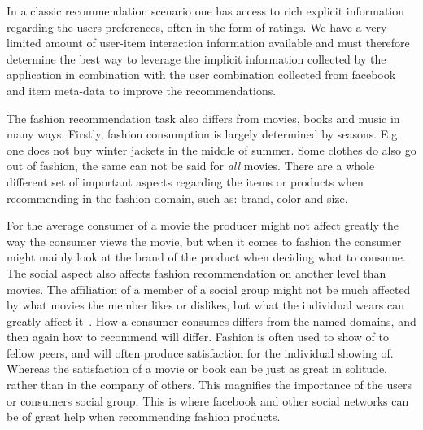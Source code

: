 In a classic recommendation scenario one has access to rich explicit information regarding the users preferences, often in the form of ratings. We have a very limited amount of user-item interaction information available and must therefore determine the best way to leverage the implicit information collected by the application in combination with the user combination collected from facebook and item meta-data to improve the recommendations.

The fashion recommendation task also differs from movies, books and music in many ways.
Firstly, fashion consumption is largely determined by seasons.
E.g. one does not buy winter jackets in the middle of summer.
Some clothes do also go out of fashion, the same can not be said for \emph{all} movies.
There are a whole different set of important aspects regarding the items or products when recommending in the fashion domain, such as: brand, color and size.

For the average consumer of a movie the producer might not affect greatly the way the consumer views the movie, but when it comes to fashion the consumer might mainly look at the brand of the product when deciding what to consume.
The social aspect also affects fashion recommendation on another level than movies.
The affiliation of a member of a social group might not be much affected by what movies the member likes or dislikes, but what the individual wears can greatly affect it~\cite{vignali2009fashion}.
How a consumer consumes differs from the named domains, and then again how to recommend will differ.
Fashion is often used to show of to fellow peers, and will often produce satisfaction for the individual showing of.
Whereas the satisfaction of a movie or book can be just as great in solitude, rather than in the company of others.
This magnifies the importance of the users or consumers social group.
This is where facebook and other social networks can be of great help when recommending fashion products.


